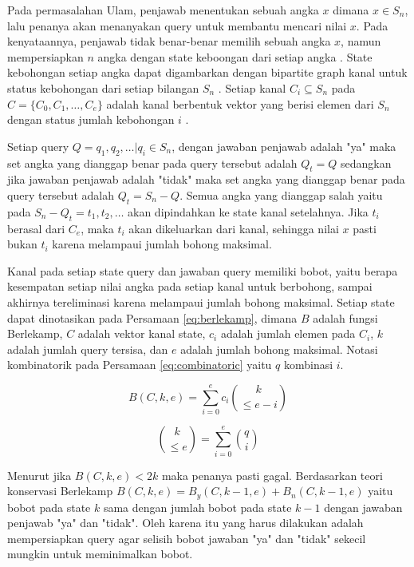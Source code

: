 Pada permasalahan Ulam, penjawab menentukan sebuah angka $x$ dimana $x \in S_n$, lalu penanya akan menanyakan query untuk membantu mencari nilai $x$. Pada kenyataannya, penjawab tidak benar-benar memilih sebuah angka $x$, namun mempersiapkan $n$ angka dengan state keboongan dari setiap angka \cite{Pelc1987}. State kebohongan setiap angka dapat digambarkan dengan bipartite graph kanal untuk status kebohongan dari setiap bilangan $S_n$ \cite{Ahlswede2008}. Setiap kanal $C_i \subseteq S_n$ pada $C=\{C_0,C_1,\ldots,C_e\}$ adalah kanal berbentuk vektor yang berisi elemen dari $S_n$ dengan status jumlah kebohongan $i$ \cite{Ellis2005}.

Setiap query $Q={q_1,q_2,\ldots} | q_i \in S_n$, dengan jawaban penjawab adalah "ya" maka set angka yang dianggap benar pada query tersebut adalah $Q_t=Q$ sedangkan jika jawaban penjawab adalah "tidak" maka set angka yang dianggap benar pada query tersebut adalah $Q_t=S_n-Q$. Semua angka yang dianggap salah yaitu pada $S_n-Q_t={t_1,t_2,\ldots}$ akan dipindahkan ke state kanal setelahnya. Jika $t_i$ berasal dari $C_e$, maka $t_i$ akan dikeluarkan dari kanal, sehingga nilai $x$ pasti bukan $t_i$ karena melampaui jumlah bohong maksimal.

Kanal pada setiap state query dan jawaban query memiliki bobot, yaitu berapa kesempatan setiap nilai angka pada setiap kanal untuk berbohong, sampai akhirnya tereliminasi karena melampaui jumlah bohong maksimal. Setiap state dapat dinotasikan pada Persamaan \ref{eq:berlekamp}, dimana $B$ adalah fungsi Berlekamp, $C$ adalah vektor kanal state, $c_i$ adalah jumlah elemen pada $C_i$, $k$ adalah jumlah query tersisa, dan $e$ adalah jumlah bohong maksimal. Notasi kombinatorik pada Persamaan \ref{eq:combinatoric} yaitu $q$ kombinasi $i$.

\begin{equation} \label{eq:berlekamp}
B(C,k,e) = \sum^{e}_{i=0} c_i \binom{k}{\leq e-i}
\end{equation}

\begin{equation} \label{eq:combinatoric}
\binom{k}{\leq e} = \sum^{e}_{i=0} \binom{q}{i}
\end{equation}

Menurut \cite{Ellis2005} jika $B(C, k, e) < 2k$ maka penanya pasti gagal. Berdasarkan teori konservasi Berlekamp \cite{Deppe2004} $B(C, k, e) = B_y(C, k-1, e) + B_n(C, k-1, e)$ yaitu bobot pada state $k$ sama dengan jumlah bobot pada state $k-1$ dengan jawaban penjawab "ya" dan "tidak". Oleh karena itu yang harus dilakukan adalah mempersiapkan query agar selisih bobot jawaban "ya" dan "tidak" sekecil mungkin untuk meminimalkan bobot.


